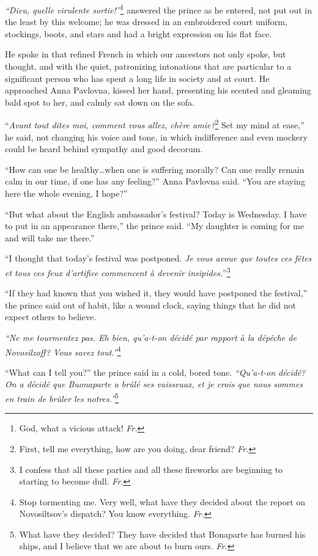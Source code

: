 \textit{``Dieu, quelle virulente sortie!''}\footnote{God, what a
  vicious attack! \textit{Fr.}} answered the prince as he entered, not
put out in the least by this welcome; he was dressed in an embroidered
court uniform, stockings, boots, and stars and had a bright expression
on his flat face.

He spoke in that refined French in which our ancestors not only spoke,
but thought, and with the quiet, patronizing intonations that are
particular to a significant person who has spent a long life in
society and at court. He approached Anna Pavlovna, kissed her hand,
presenting his scented and gleaming bald spot to her, and calmly sat
down on the sofa.

``\textit{Avant tout dites moi, comment vous allez, ch\`ere
  amie?}\footnote{First, tell me everything, how are you doing, dear
  friend? \textit{Fr.}} Set my mind at ease,'' he said, not changing
his voice and tone, in which indifference and even mockery could be
heard behind sympathy and good decorum. %

``How can one be healthy\ldots{}when one is suffering morally? Can one
really remain calm in our time, if one has any feeling?'' Anna
Pavlovna said. ``You are staying here the whole evening, I hope?''

``But what about the English ambassador's festival? Today is
Wednesday. I have to put in an appearance there,'' the prince
said. ``My daughter is coming for me and will take me there.'' %

``I thought that today's festival was postponed. \textit{Je vous avoue
  que toutes ces f\^etes et tous ces feux d'artifice commencent \`a
  devenir insipides.}''\footnote{I confess that all these parties and
  all these fireworks are beginning to starting to become
  dull. \textit{Fr.}} %

``If they had known that you wished it, they would have postponed the
festival,'' the prince said out of habit, like a wound clock, saying
things that he did not expect others to believe. %

\textit{``Ne me tourmentez pas. Eh bien, qu'a-t-on d\'ecid\'e par
  rapport \`a la d\'ep\^eche de Novosilzoff? Vous savez
  tout.''}\footnote{Stop tormenting me. Very well, what have they
  decided about the report on Novosiltsov's dispatch? You know
  everything. \textit{Fr.}} %

``What can I tell you?'' the prince said in a cold, bored
tone. \textit{``Qu'a-t-on d\'ecid\'e? On a d\'ecid\'e que Buonaparte a
  br\^ul\'e ses vaisseuax, et je crois que nous sommes en train de
  br\^uler les notres.''}\footnote{What have they decided? They have
  decided that Bonaparte has burned his ships, and I believe that we
  are about to burn ours. \textit{Fr.}} %

